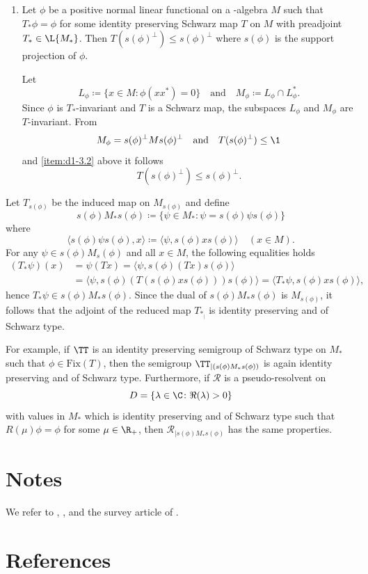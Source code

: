 \begin{enumerate}[1., wide, labelindent=.25em]
\item
Let $ \phi $ be a positive normal linear functional on a \WA-algebra $ M $ such that $ T_{*}\phi = \phi $ for some identity preserving Schwarz map $ T $ on $ M $ with preadjoint 
$ T_{*} \in \L{M_{*}} $.
Then $ T(s(\phi)^{\perp}) \leq s(\phi)^{\perp} $ where $ s(\phi) $ is the support projection of\/ $ \phi $.

Let 
%
\[
	L_\phi \coloneqq \{ x \in M \colon \phi(xx^{*}) = 0 \}
	\quad \text{and} \quad
	M_\phi \coloneqq L_\phi \cap L_\phi^{*} .
\]
%
Since $ \phi $ is $ T_{*} $-invariant and $ T $ is a Schwarz map, the subspaces $ L_{\phi} $ and $ M_{\phi} $ are $ T $-invariant.
From 
\[ 
M_{\phi} = s(\phi)^{\perp}Ms(\phi)^{\perp} 
\quad \text{and} \quad 
T(s(\phi)^{\perp}) \leq \1 
\]
and \eqref{item:d1-3.2} above it follows 
\[ 
T(s(\phi)^{\perp}) \leq s(\phi)^{\perp}  .
\]
\end{enumerate}
Let $ T_{s(\phi)} $ be the induced map on $ M_{s(\phi)} $ and define
\[
	s(\phi)M_{*}s(\phi) \coloneqq \{\psi \in M_{*} \colon \psi = s(\phi)\psi s(\phi)\}
\]
where 
\[ 
\langle s(\phi)\psi s(\phi),x \rangle \coloneqq 
    \langle \psi,s(\phi)xs(\phi) \rangle \quad  (  x \in M  ).
\]
For any $\psi \in s(\phi)M_s(\phi)$ and all $x \in M$, the following equalities holds
\begin{align*}
(T_{*}\psi)(x) &= \psi(Tx) = \langle \psi,s(\phi)(Tx)s(\phi) \rangle \\
	&= \langle \psi,s(\phi)(T(s(\phi)xs(\phi)))s(\phi) \rangle = \langle T_{*}\psi,s(\phi)xs(\phi) \rangle,
\end{align*}
hence $ T_{*}\psi \in s(\phi)M_{*}s(\phi) $.
Since the dual of\/ $ s(\phi)M_{*}s(\phi) $ is $ M_{s(\phi)} $, it follows that the adjoint of the reduced map $ T_{*_{|}} $ is identity preserving and of Schwarz type.

For example, if\/ $ \TT $ is an identity preserving semigroup of Schwarz type on $ M_{*} $ such that $ \phi \in \text{Fix}(T) $, then the semigroup $ \TT_{\vert (s(\phi)M_{*}s(\phi))} $ is again identity preserving and of Schwarz type.
Furthermore, if  $ \mathcal{R} $ is a pseudo-resolvent on 
%
\[
	D = \{\lambda \in \C \colon \Re(\lambda) > 0\} 
\]
%
with values in $ M_{*} $ which is identity preserving and of Schwarz type such that $ R(\mu)\phi = \phi $ for some $ \mu \in \R_{+} $, then $ \mathcal{R}_{\vert s(\phi)M_{*}s(\phi)} $ has the same properties.

\section*{Notes}
We refer to \textcite{brattelirobinson:1979}, \textcite{brattelirobinson:1981}, \textcite{davies:1976} and the survey article of \textcite{oseledets:1984}.
\section*{References}
{\RaggedRight
  \printbibliography[heading=none]
 }